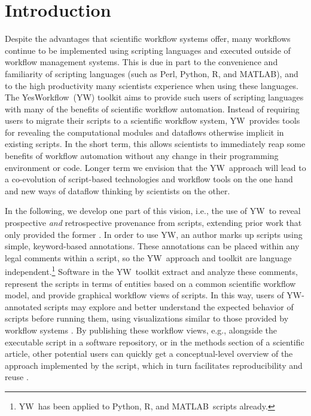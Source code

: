 \documentclass[letterpaper,twocolumn,10pt]{article}
\newcommand{\YW}{\textsf{YesWorkflow}}
\newcommand{\yw}{\textsf{YW}}
\newcommand{\R}{\textsf{R}}
\newcommand{\MATLAB}{\textsf{MATLAB}}
\begin{document}
%
\section{Introduction} \label{intro}

Despite the advantages that scientific workflow systems offer, many
workflows continue to be implemented using scripting languages and
executed outside of workflow management systems. This is due in part
to the convenience and familiarity of scripting languages (such as
Perl, Python, \R, and \MATLAB), and to the high productivity many
scientists experience when using these languages. The \YW\ (\yw) toolkit
\cite{yw-website,mcphillips2015ywIJDC} aims to provide
such users of scripting languages with many of the benefits of
scientific workflow automation. Instead of requiring users to migrate
their scripts to a scientific workflow system, \yw\ provides tools for
revealing the computational modules and dataflows otherwise implicit
in existing scripts. In the short term, this allows scientists to
immediately reap some benefits of workflow automation without any
change in their programming environment or code. Longer term we
envision that the \yw\ approach will lead to a co-evolution of
script-based technologies and workflow tools on the one hand and new
ways of dataflow thinking by %
scientists on the other.

In the following, we develop one part of this vision, i.e., the use of
\yw\ to reveal prospective \emph{and} retrospective provenance
\cite{zhao2006applying} from scripts, extending prior work that only
provided the former \cite{mcphillips2015ywIJDC}.
In order to use \yw, an author marks up scripts using simple,
keyword-based annotations. These annotations can be placed within any
legal comments within a script, so the \yw\ approach and toolkit are 
language independent.\footnote{\yw\ has been applied to
  Python, \R, and \MATLAB\ scripts already.}  %
%
Software in the \yw\ toolkit extract and analyze these comments,
represent the scripts in terms of entities based on a common
scientific workflow model, and provide graphical workflow views of
scripts. In this way, users of \yw-annotated scripts may explore and
better understand the expected behavior of scripts before running
them, using visualizations similar to those provided by workflow
systems 
\cite{ludascher2006scientific,wolstencroft2013taverna,freire2014reproducibility}.
By publishing these workflow views, e.g., alongside the executable
script in a software repository, or in the methods section of a
scientific article, other potential users can quickly get a
conceptual-level overview of the approach implemented by the script,
which in turn facilitates reproducibility and reuse
\cite{gandrud2013reproducible,stodden2014implementing}.
\end{document}
